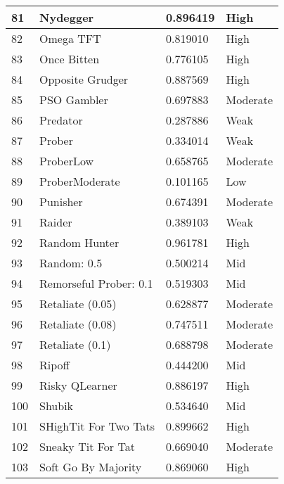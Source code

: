 \begin{longtable}{|p{0.5cm}||p{6cm}||p{4cm}||p{2cm}|}
			81  & Nydegger                    & 0.896419          & High     \\ \hline
			82  & Omega TFT                   & 0.819010          & High     \\ \hline
			83  & Once Bitten                 & 0.776105          & High     \\ \hline
			84  & Opposite Grudger            & 0.887569          & High     \\ \hline
			85  & PSO Gambler                 & 0.697883          & Moderate \\ \hline
			86  & Predator                    & 0.287886          & Weak     \\ \hline
			87  & Prober                      & 0.334014          & Weak     \\ \hline
			88  & ProberLow                   & 0.658765          & Moderate \\ \hline
			89  & ProberModerate              & 0.101165          & Low      \\ \hline
			90  & Punisher                    & 0.674391          & Moderate \\ \hline
			91  & Raider                      & 0.389103          & Weak     \\ \hline
			92  & Random Hunter               & 0.961781          & High     \\ \hline
			93  & Random: 0.5                 & 0.500214          & Mid     \\ \hline
			94  & Remorseful Prober: 0.1      & 0.519303          & Mid     \\ \hline
			95  & Retaliate (0.05)            & 0.628877          & Moderate \\ \hline
			96  & Retaliate (0.08)            & 0.747511          & Moderate \\ \hline
			97  & Retaliate (0.1)             & 0.688798          & Moderate \\ \hline
			98  & Ripoff                      & 0.444200          & Mid     \\ \hline
			99  & Risky QLearner              & 0.886197          & High     \\ \hline
			100 & Shubik                      & 0.534640          & Mid     \\ \hline
			101 & SHighTit For Two Tats       & 0.899662          & High     \\ \hline
			102 & Sneaky Tit For Tat          & 0.669040          & Moderate \\ \hline
			103 & Soft Go By Majority         & 0.869060          & High     \\ \hline

\end{longtable}
